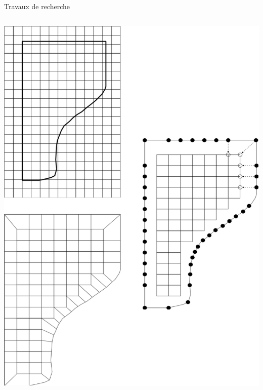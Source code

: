 \documentclass[compress,10pt,aspectratio=169]{beamer}
\begin{document}
\begin{frame}{Travaux de recherche}
\begin{columns}
\begin{column}{0.25
        \textwidth}
{    \includegraphics[scale=0.28]{images/superpo_grid_1_beam.pdf}
\vspace{0.18cm}
}
\end{column}
\end{columns}
\end{frame}
\end{document}
